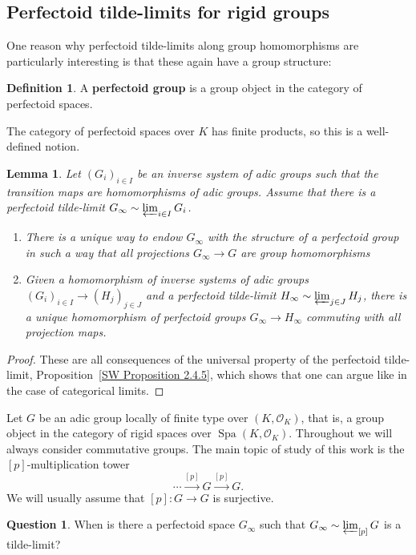 \documentclass[10pt,oneside]{amsart}
\newtheorem{lemma}[theorem]{Lemma}
\theoremstyle{definition}
\newtheorem{definition}[theorem]{Definition}
\newtheorem{question}[theorem]{Question}
\newcommand{\Spa}{\operatorname{Spa}}
\renewcommand{\O}{\mathcal{O}}
\begin{document}
\subsection{Perfectoid tilde-limits for rigid groups}

One reason why perfectoid tilde-limits along group homomorphisms are particularly interesting is that these again have a group structure:

\begin{definition}
	A \textbf{perfectoid group} is a group object in the category of perfectoid spaces.
\end{definition}
The category of perfectoid spaces over $K$ has finite products, so this is a well-defined notion.

\begin{lemma}\label{perfectoid tilde-limit is perfectoid group in a functorial way}
	Let $(G_i)_{i\in I}$ be an inverse system of adic groups such that the transition maps are homomorphisms of adic groups. Assume that there is a perfectoid tilde-limit $G_\infty\sim \varprojlim_{i\in I}G_i$.
	\begin{enumerate}
		\item  There is a unique way to endow $G_\infty$ with the structure of a perfectoid group in such a way that all projections $G_\infty\rightarrow G$ are group homomorphisms
		\item Given a homomorphism of inverse systems of adic groups $(G_i)_{i\in I}\to (H_j)_{j\in J}$ and a perfectoid tilde-limit $H_\infty\sim\varprojlim_{j\in J}H_j$, there is a unique homomorphism of perfectoid groups $G_\infty\rightarrow H_\infty$
		commuting with all projection maps.
	\end{enumerate}
\end{lemma}
\begin{proof}
	These are all consequences of the universal property of the perfectoid tilde-limit, Proposition~\ref{SW Proposition 2.4.5}, which shows that one can argue like in the case of categorical limits.
\end{proof}

Let $G$ be an adic group locally of finite type over $(K,\O_K)$, that is, a group object in the category of rigid spaces over $\Spa(K,\O_K)$. Throughout we will always consider commutative groups. The main topic of study of this work is the $[p]$-multiplication tower
\[ \cdots\xrightarrow{[p]}G\xrightarrow{[p]}G.\]
We will usually assume that $[p]\colon G\to G$ is surjective.
\begin{question}\label{qu:tilde-limits-of-adic-groups}
	When is there a perfectoid space $G_\infty$ such that $G_\infty \sim \varprojlim_{[p]} G$ is a tilde-limit?
\end{question}
\end{document}

